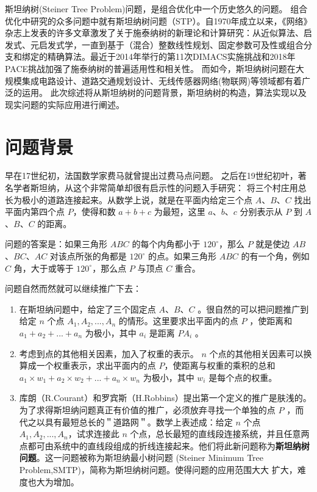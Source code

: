 \documentclass{SCIS2022cn}
\begin{document}
斯坦纳树(Steiner Tree Problem)问题，是组合优化中一个历史悠久的问题。
组合优化中研究的众多问题中就有斯坦纳树问题（STP）。自1970年成立以来，《网络》杂志上发表的许多文章激发了关于施泰纳树的新理论和计算研究：从近似算法、启发式、元启发式学，一直到基于（混合）整数线性规划、固定参数可及性或组合分支和绑定的精确算法。最近于2014年举行的第11次DIMACS实施挑战和2018年PACE挑战加强了施泰纳树的普遍适用性和相关性。\cite{1}
而如今，斯坦纳树问题在大规模集成电路设计、道路交通规划设计、无线传感器网络(物联网)等领域都有着广泛的运用。
此次综述将从斯坦纳树的问题背景，斯坦纳树的构造，算法实现以及现实问题的实际应用进行阐述。


\section{问题背景}

早在17世纪初，法国数学家费马就曾提出过费马点问题。
之后在19世纪初叶，著名学者斯坦纳，从这个非常简单却很有启示性的问题入手研究：
将三个村庄用总长为极小的道路连接起来。从数学上说，就是在平面内给定三个点 $A$、$B$、$C$ 找出平面内第四个点 $P$，使得和数 $a+b+c$ 为最短，这里 $a$、$b$、$c$ 分别表示从 $P$ 到 $A$、$B$、$C$ 的距离\cite{5}。

问题的答案是：如果三角形 $ABC$ 的每个内角都小于 $120^{\circ}$，那么 $P$ 就是使边 $AB$、$BC$、$AC$ 对该点所张的角都是 $120^{\circ}$ 的点。如果三角形 $ABC$ 的有一个角，例如 $C$ 角，大于或等于 $120^{\circ}$，那么点 $P$ 与顶点 $C$ 重合\cite{5}。

问题自然而然就可以继续推广下去\cite{3}：

\begin{enumerate}
    \item 在斯坦纳问题中，给定了三个固定点 $A$、$B$、$C$ 。很自然的可以把问题推广到给定 $n$ 个点 $A_1,A_2,...,A_n$ 的情形。这里要求出平面内的点 $P$ ，使距离和 $a_1+a_2+...+a_n$ 为极小，其中 $a_i$ 是距离 $PA_i$ 。
    \item 考虑到点的其他相关因素，加入了权重的表示。 $n$ 个点的其他相关因素可以换算成一个权重表示，求出平面内的点 $P$，使距离与权重的乘积的总和 $a_1 \times w_1+a_2 \times w_2+...+a_n \times w_n$ 为极小，其中 $w_i$ 是每个点的权重。 
    \item 库朗（R.Courant）和罗宾斯（H.Robbins）提出第一个定义的推广是肤浅的。为了求得斯坦纳问题真正有价值的推广，必须放弃寻找一个单独的点 $P$ ，而代之以具有最短总长的＂道路网＂。数学上表述成：给定 $n$ 个点 $A_1,A_2,...,A_n$，试求连接此 $n$ 个点，总长最短的直线段连接系统，并且任意两点都可由系统中的直线段组成的折线连接起来。他们将此新问题称为\textbf{斯坦纳树问题}。这一问题被称为斯坦纳最小树问题 (Steiner Minimum Tree Problem,SMTP)，简称为斯坦纳树问题。使得问题的应用范围大大 扩大，难度也大为增加。
\end{enumerate}
\end{document}
